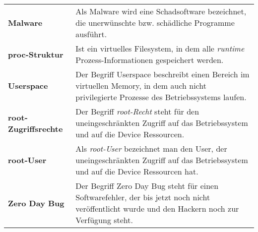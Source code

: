 \begin{table*}[htbp]
\begin{center}
\begin{tabular}{p{3cm}p{12cm}}
		  \textbf{Malware} &  Als Malware wird eine Schadsoftware bezeichnet, die unerwünschte bzw. schädliche Programme ausführt.\\
		 
		  \textbf{proc-Struktur} & Ist ein virtuelles Filesystem, in dem alle \textit{\glqq runtime\grqq{}} Prozess-Informationen gespeichert werden.\\
		  
		  \textbf{Userspace} & Der Begriff Userspace beschreibt einen Bereich im virtuellen Memory, in dem auch nicht privilegierte Prozesse des Betriebssystems laufen.\\
		  
		 \textbf{root-Zugriffsrechte} &  Der Begriff \textit{\glqq root-Recht\grqq{}} steht für den uneingeschränkten Zugriff auf das Betriebssystem und auf die Device Ressourcen.\\
		 \textbf{root-User} &  Als \textit{\glqq root-User\grqq{}} bezeichnet man den User, der uneingeschränkten Zugriff auf das Betriebssystem und auf die Device Ressourcen hat.\\ 
		 \textbf{Zero Day Bug} &  Der Begriff Zero Day Bug steht für einen Softwarefehler, der bis jetzt noch nicht veröffentlicht wurde und den Hackern noch zur Verfügung steht.\\
		  
		\end{tabular}		    
    \end{center}
\end{table*}